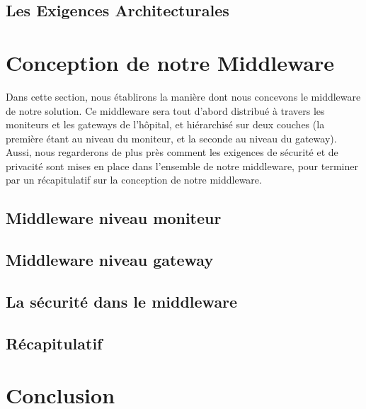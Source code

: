 \documentclass{article}
\begin{document}
\subsection{Les Exigences Architecturales}


\section{Conception de notre Middleware}
Dans cette section, nous établirons la manière dont nous concevons le middleware de notre solution. Ce middleware sera tout d'abord distribué à travers les moniteurs et les gateways de l'hôpital, et hiérarchisé sur deux couches (la première étant au niveau du moniteur, et la seconde au niveau du gateway). Aussi, nous regarderons de plus près comment les exigences de sécurité et de privacité sont mises en place dans l'ensemble de notre middleware, pour terminer par un récapitulatif sur la conception de notre middleware.

\subsection{Middleware niveau moniteur}

\subsection{Middleware niveau gateway}

\subsection{La sécurité dans le middleware}

\subsection{Récapitulatif}


%

\section{ Conclusion }

 







\end{document}
